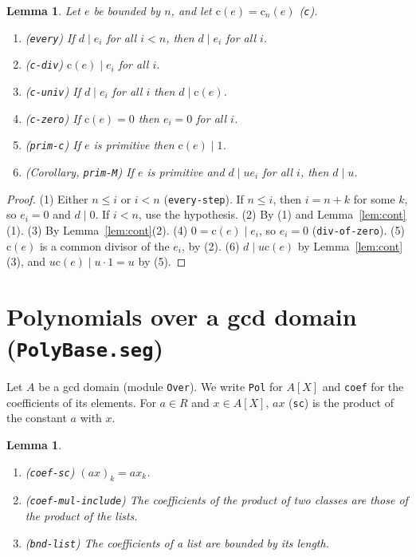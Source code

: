 \documentclass[11pt]{amsart}
\newtheorem{lemma}[theorem]{Lemma}
\theoremstyle{definition}
\theoremstyle{remark}
\newcommand{\nm}[1]{\textup{\texttt{#1}}}
\newcommand{\file}[1]{\textup{\texttt{#1.seg}}}
\newcommand{\cont}{\mathrm{c}}
\begin{document}
\begin{lemma}\label{lem:bounded}
Let $e$ be bounded by $n$, and let $\cont(e) = \cont_n(e)$ (\nm{c}).
\begin{enumerate}
\item (\nm{every}) If $d\mid e_i$ for all $i<n$, then $d\mid e_i$ for
  all $i$.
\item (\nm{c-div}) $\cont(e)\mid e_i$ for all $i$.
\item (\nm{c-univ}) If $d\mid e_i$ for all $i$ then $d\mid\cont(e)$.
\item (\nm{c-zero}) If $\cont(e) = 0$ then $e_i = 0$ for all $i$.
\item (\nm{prim-c}) If $e$ is primitive then $\cont(e)\mid1$.
\item (Corollary, \nm{prim-M}) If $e$ is primitive and $d\mid ue_i$ for
  all $i$, then $d\mid u$.
\end{enumerate}
\end{lemma}
\begin{proof}
(1) Either $n\le i$ or $i<n$ (\nm{every-step}). If $n\le i$, then
$i = n + k$ for some $k$, so $e_i = 0$ and $d\mid0$. If $i<n$, use the
hypothesis.
(2) By (1) and Lemma~\ref{lem:cont}(1).
(3) By Lemma~\ref{lem:cont}(2).
(4) $0 = \cont(e)\mid e_i$, so $e_i=0$ (\nm{div-of-zero}).
(5) $\cont(e)$ is a common divisor of the $e_i$, by (2).
(6) $d\mid u\cont(e)$ by Lemma~\ref{lem:cont}(3), and
$u\cont(e)\mid u\cdot1 = u$ by (5).
\end{proof}

\section{Polynomials over a gcd domain (\file{PolyBase})}

Let $A$ be a gcd domain (module \nm{Over}). We write \nm{Pol} for $A[X]$
and \nm{coef} for the coefficients of its elements. For $a\in R$ and
$x\in A[X]$, $ax$ (\nm{sc}) is the product of the constant $a$ with $x$.

\begin{lemma}
\begin{enumerate}
\item (\nm{coef-sc}) $(ax)_k = a x_k$.
\item (\nm{coef-mul-include}) The coefficients of the product of two
  classes are those of the product of the lists.
\item (\nm{bnd-list}) The coefficients of a list are bounded by its
  length.
\end{enumerate}
\end{lemma}
\end{document}
